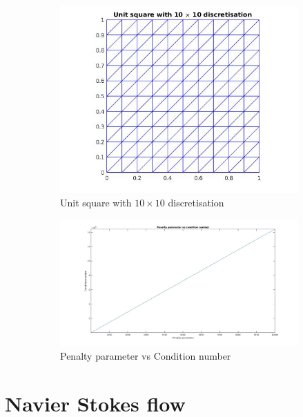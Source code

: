 \documentclass[a4paper]{book}
\begin{document}
\begin{figure}
\begin{subfigure}{\textwidth}	
  \includegraphics[width=\linewidth]{grid_penalty_parameter.jpg}
  \caption{Unit square with $10 \times 10$ discretisation}
  \label{grid_penalty_para}
\end{subfigure}
\begin{subfigure}{\textwidth}	
	\includegraphics[width=\linewidth]{penalty_condition_number.jpg}
	\caption{Penalty parameter vs Condition number}
	\label{penalty_condition_number}
\end{subfigure}
\caption{\label{effect_penalty_parameter}}
\end{figure}

\section{Navier Stokes flow}\label{N-S-ch5}
\end{document}
